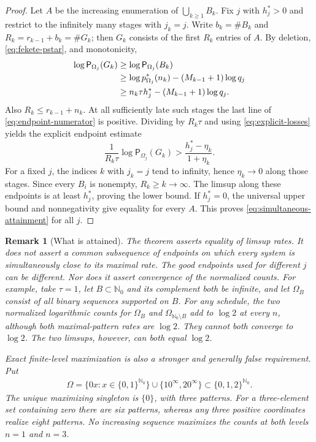 \documentclass[11pt,reqno]{amsart}
\numberwithin{equation}{section}
\newtheorem{remark}[theorem]{Remark}
\theoremstyle{definition}
\newcommand{\Nzero}{\mathbb N_0}
\newcommand{\Patt}{\mathsf P}
\begin{document}
\begin{proof}
Let $A$ be the increasing enumeration of $\bigcup_{k\ge1}B_k$.  Fix $j$
with $h_j^*>0$ and restrict to the infinitely many stages with $j_k=j$.
Write $b_k=\#B_k$ and $R_k=r_{k-1}+b_k=\#G_k$; then $G_k$ consists of the
first $R_k$ entries of $A$.  By deletion, \eqref{eq:fekete-pstar}, and
monotonicity,
\begin{align}
 \log\Patt_{\Omega_j}(G_k)
 &\ge \log\Patt_{\Omega_j}(B_k)\notag\\
 &\ge \log p_{\Omega_j}^*(n_k)-(M_{k-1}+1)\log q_j\notag\\
 &\ge n_k\tau h_j^*-(M_{k-1}+1)\log q_j.
 \label{eq:endpoint-numerator}
\end{align}
Also $R_k\le r_{k-1}+n_k$.  At all sufficiently late such stages the last
line of \eqref{eq:endpoint-numerator} is positive.  Dividing by $R_k\tau$
and using \eqref{eq:explicit-losses} yields the explicit endpoint estimate
\begin{equation}\label{eq:endpoint-bound}
 \frac1{R_k\tau}\log\Patt_{\Omega_j}(G_k)
 >\frac{h_j^*-\eta_k}{1+\eta_k}.
\end{equation}
For a fixed $j$, the indices $k$ with $j_k=j$ tend to infinity, hence
$\eta_k\to0$ along those stages. Since every $B_i$ is nonempty,
$R_k\ge k\to\infty$. The limsup along these
endpoints is at least $h_j^*$, proving the lower
bound.  If $h_j^*=0$, the universal upper bound and nonnegativity give
equality for every $A$.  This proves \eqref{eq:simultaneous-attainment} for
all $j$.
\end{proof}

\begin{remark}[What is attained]\label{rem:attainment}
The theorem asserts equality of limsup rates. It does not assert a common
subsequence of endpoints on which every system is simultaneously close
to its maximal rate. The good endpoints used for different $j$ can be
different. Nor does it assert convergence of the normalized counts.
For example, take $\tau=1$, let $B\subset\Nzero$ and its complement both be infinite,
and let $\Omega_B$ consist of all binary sequences supported on $B$.
For any schedule, the two normalized logarithmic counts for $\Omega_B$
and $\Omega_{\Nzero\setminus B}$ add to $\log2$ at every $n$, although
both maximal-pattern rates are $\log2$. They cannot both converge to
$\log2$. The two limsups, however, can both equal $\log2$.

Exact finite-level maximization is also a stronger and generally false
requirement. Put
\begin{align*}
 \Omega=\{0x:x\in\{0,1\}^{\Nzero}\}\cup\{10^\infty,20^\infty\}
 \subset\{0,1,2\}^{\Nzero}.
\end{align*}
The unique maximizing singleton is $\{0\}$, with three patterns.
For a three-element set containing zero there are six patterns, whereas
any three positive coordinates realize eight patterns. No increasing
sequence maximizes the counts at both levels $n=1$ and $n=3$.
\end{remark}
\end{document}
